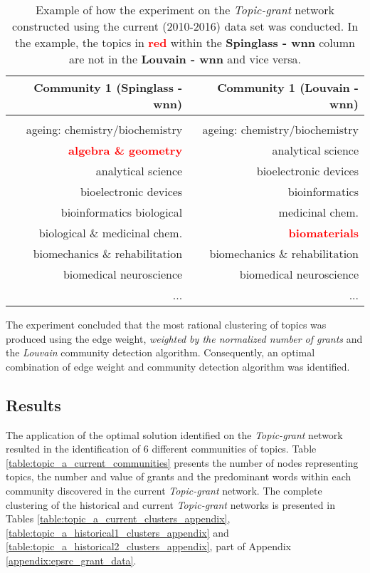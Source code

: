 \begin{table}[!htbp]
\centering
\caption[Example of how the experiment on the \textit{Topic-grant} network constructed using the current (2010-2016) data set was conducted.]{Example of how the experiment on the \textit{Topic-grant} network constructed using the current (2010-2016) data set was conducted. In the example, the topics in \textcolor{red}{\textbf{red}} within the \textbf{Spinglass - wnn} column are not in the \textbf{Louvain - wnn} and vice versa.}
\label{table:topic_a_current_community_comparison}
\begin{tabular}{r|r}
\textbf{Community 1 (Spinglass - wnn)} & \textbf{Community 1 (Louvain - wnn)}\\
\hline\\
{ageing: chemistry/biochemistry}     & {ageing: chemistry/biochemistry}\\
\textcolor{red}{\textbf{algebra \& geometry}} & {analytical science}\\
{analytical science}                 & {bioelectronic devices}\\
{bioelectronic devices}              & {bioinformatics}\\
{bioinformatics	biological}          & {medicinal chem.}\\
{biological \& medicinal chem.}	     & \textcolor{red}{\textbf{biomaterials}}\\
{biomechanics \& rehabilitation}     & {biomechanics \& rehabilitation}\\
{biomedical neuroscience}	         & {biomedical neuroscience}\\
{...} & {...}
\end{tabular}
\end{table}

The experiment concluded that the most rational clustering of topics was produced using the edge weight, \textit{weighted by the normalized number of grants} and the \textit{Louvain} community detection algorithm. Consequently, an optimal combination of edge weight and community detection algorithm was identified.

\subsection{Results}

The application of the optimal solution identified on the \textit{Topic-grant} network resulted in the identification of 6 different communities of topics. Table \ref{table:topic_a_current_communities} presents the number of nodes representing topics, the number and value of grants and the predominant words within each community discovered in the current \textit{Topic-grant} network. The complete clustering of the historical and current \textit{Topic-grant} networks is presented in Tables \ref{table:topic_a_current_clusters_appendix}, \ref{table:topic_a_historical1_clusters_appendix} and \ref{table:topic_a_historical2_clusters_appendix}, part of Appendix \ref{appendix:epsrc_grant_data}.

